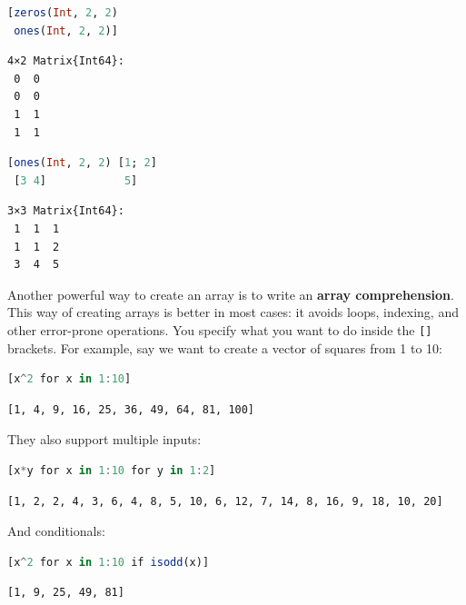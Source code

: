 \documentclass[
  notoc %
]{tufte-book}
\newcommand{\passthrough}[1]{#1}
\begin{document}
\begin{lstlisting}[language=Julia]
[zeros(Int, 2, 2)
 ones(Int, 2, 2)]
\end{lstlisting}

\begin{lstlisting}[language=Output]
4×2 Matrix{Int64}:
 0  0
 0  0
 1  1
 1  1
\end{lstlisting}

\begin{lstlisting}[language=Julia]
[ones(Int, 2, 2) [1; 2]
 [3 4]            5]
\end{lstlisting}

\begin{lstlisting}[language=Output]
3×3 Matrix{Int64}:
 1  1  1
 1  1  2
 3  4  5
\end{lstlisting}

Another powerful way to create an array is to write an \textbf{array
comprehension}. This way of creating arrays is better in most cases: it
avoids loops, indexing, and other error-prone operations. You specify
what you want to do inside the \passthrough{\lstinline![]!} brackets.
For example, say we want to create a vector of squares from 1 to 10:

\begin{lstlisting}[language=Julia]
[x^2 for x in 1:10]
\end{lstlisting}

\begin{lstlisting}[language=Output]
[1, 4, 9, 16, 25, 36, 49, 64, 81, 100]
\end{lstlisting}

They also support multiple inputs:

\begin{lstlisting}[language=Julia]
[x*y for x in 1:10 for y in 1:2]
\end{lstlisting}

\begin{lstlisting}[language=Output]
[1, 2, 2, 4, 3, 6, 4, 8, 5, 10, 6, 12, 7, 14, 8, 16, 9, 18, 10, 20]
\end{lstlisting}

And conditionals:

\begin{lstlisting}[language=Julia]
[x^2 for x in 1:10 if isodd(x)]
\end{lstlisting}

\begin{lstlisting}[language=Output]
[1, 9, 25, 49, 81]
\end{lstlisting}
\end{document}
